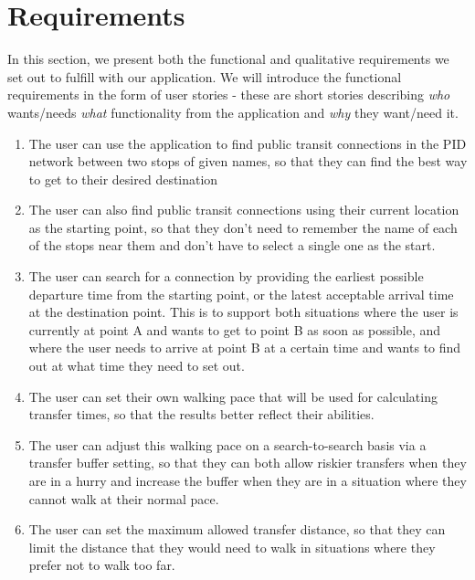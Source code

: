 \newpage

\section{Requirements}

In this section, we present both the functional and qualitative requirements we set out to fulfill with our application. We will introduce the functional requirements in the form of user stories - these are short stories describing \textit{who} wants/needs \textit{what} functionality from the application and \textit{why} they want/need it.

\begin{enumerate}
\renewcommand{\labelenumi}{\textbf{R\arabic{enumi}}}
\item The user can use the application to find public transit connections in the PID network between two stops of given names, so that they can find the best way to get to their desired destination
\label{req:finds_connection}

\item The user can also find public transit connections using their current location as the starting point, so that they don't need to remember the name of each of the stops near them and don't have to select a single one as the start.
\label{req:src_by_coords}

\item The user can search for a connection by providing the earliest possible departure time from the starting point, or the latest acceptable arrival time at the destination point. This is to support both situations where the user is currently at point A and wants to get to point B as soon as possible, and where the user needs to arrive at point B at a certain time and wants to find out at what time they need to set out.
\label{req:arr_dep_time}

\item The user can set their own walking pace that will be used for calculating transfer times, so that the results better reflect their abilities.
\label{req:walking_pace}

\item The user can adjust this walking pace on a search-to-search basis via a transfer buffer setting, so that they can both allow riskier transfers when they are in a hurry and increase the buffer when they are in a situation where they cannot walk at their normal pace.
\label{req:transfer_buffer}

\item The user can set the maximum allowed transfer distance, so that they can limit the distance that they would need to walk in situations where they prefer not to walk too far.
\label{req:max_transfer_distance}


\end{enumerate}
